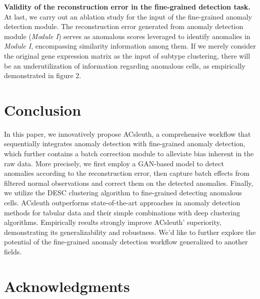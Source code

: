 \documentclass{article}
\begin{document}
\textbf{Validity of the reconstruction error in the fine-grained detection task.}	At last, we carry out an 
ablation study for the input of the fine-grained anomaly detection module. The 
reconstruction error generated from anomaly detection module (\textit{Module I}) serves as 
anomalous scores leveraged to identify anomalies in \textit{Module I}, encompassing similarity 
information among them. If we merely consider the original gene expression matrix as the 
input of subtype clustering, there will be an underutilization of information regarding 
anomalous cells, as empirically demonstrated in figure 2.
\section{Conclusion}
In this paper, we innovatively propose ACsleuth, a comprehensive workflow that sequentially 
integrates anomaly detection with fine-grained anomaly detection, which further contains a batch 
correction module to alleviate bias inherent in the raw data. More precisely, we first 
employ a GAN-based model to detect anomalies according to the reconstruction error, then 
capture batch effects from filtered normal observations and correct them on the detected 
anomalies. Finally, we utilize the DESC clustering algorithm to fine-grained detecting anomalous cells. 
ACsleuth outperforms state-of-the-art approaches in anomaly detection methods for tabular 
data and their simple combinations with deep clustering algorithms. Empirically results 
strongly improve ACsleuth’ superiority, demonstrating its generalizability and robustness. 
We’d like to further explore the potential of the fine-grained anomaly detection workflow generalized to another fields.
\section*{Acknowledgments}





\end{document}
